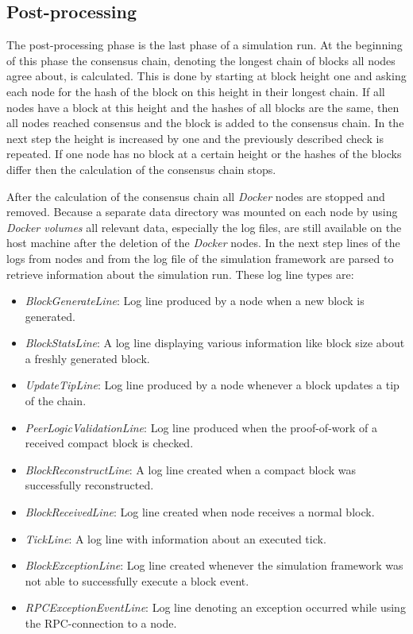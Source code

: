 \subsection{Post-processing}

The post-processing phase is the last phase of a simulation run.
At the beginning of this phase the consensus chain, denoting the longest chain of blocks all nodes agree about, is calculated.
This is done by starting at block height one and asking each node for the hash of the block on this height in their longest chain.
If all nodes have a block at this height and the hashes of all blocks are the same, then all nodes reached consensus and the block is added to the consensus chain.
In the next step the height is increased by one and the previously described check is repeated.
If one node has no block at a certain height or the hashes of the blocks differ then the calculation of the consensus chain stops.

After the calculation of the consensus chain all \textit{Docker} nodes are stopped and removed.
Because a separate data directory was mounted on each node by using \textit{Docker volumes} all relevant data, especially the log files, are still available on the host machine after the deletion of the \textit{Docker} nodes.
In the next step lines of the logs from nodes and from the log file of the simulation framework are parsed to retrieve information about the simulation run.
These log line types are:

\begin{itemize}
   \item \textit{BlockGenerateLine}: Log line produced by a node when a new block is generated.
   \item \textit{BlockStatsLine}: A log line displaying various information like block size about a freshly generated block.
   \item \textit{UpdateTipLine}: Log line produced by a node whenever a block updates a tip of the chain.
   \item \textit{PeerLogicValidationLine}: Log line produced when the proof-of-work of a received compact block is checked.  
   \item \textit{BlockReconstructLine}: A log line created when a compact block was successfully reconstructed.
   \item \textit{BlockReceivedLine}: Log line created when node receives a normal block.
   \item \textit{TickLine}: A log line with information about an executed tick.
   \item \textit{BlockExceptionLine}: Log line created whenever the simulation framework was not able to successfully execute a block event.
   \item \textit{RPCExceptionEventLine}: Log line denoting an exception occurred while using the RPC-connection to a node.
\end{itemize}

